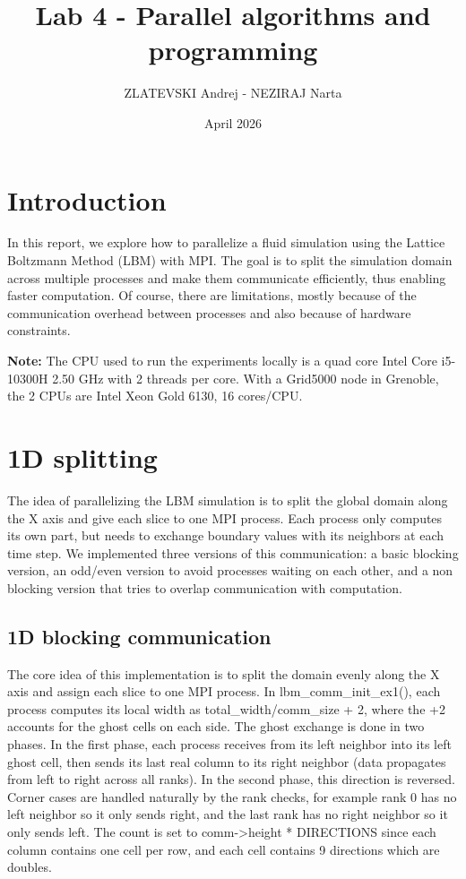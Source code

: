 \documentclass{article}
\title{Lab 4 - Parallel algorithms and programming}
\author{ZLATEVSKI Andrej - NEZIRAJ Narta}
\date{April 2026}
\begin{document}
\maketitle

\section{Introduction}

In this report, we explore how to parallelize a fluid simulation using the Lattice Boltzmann Method (LBM) with MPI. The goal is to split the simulation domain across multiple processes and make them communicate efficiently, thus enabling faster computation. Of course, there are limitations, mostly because of the communication overhead between processes and also because of hardware constraints. 

\vspace{5mm}
\textbf{Note:} The CPU used to run the experiments locally is a quad core Intel Core i5-10300H 2.50 GHz with 2 threads per core. With a Grid5000 node in Grenoble, the 2 CPUs are Intel Xeon Gold 6130, 16 cores/CPU.


\section{1D splitting }

The idea of parallelizing the LBM simulation is to split the global domain along the X axis and give each slice to one MPI process. Each process only computes its own part, but needs to exchange boundary values with its neighbors at each time step. We implemented three versions of this communication: a basic blocking version, an odd/even version to avoid processes waiting on each other, and a non blocking version that tries to overlap communication with computation.


\subsection{1D blocking communication}

The core idea of this implementation is to split the domain evenly along the X axis and assign each slice to one MPI process. In lbm\_comm\_init\_ex1(), each process computes its local width as total\_width/comm\_size + 2, where the +2 accounts for the ghost cells on each side. The ghost exchange is done in two phases. In the first phase, each process receives from its left neighbor into its left ghost cell, then sends its last real column to its right neighbor (data propagates from left to right across all ranks). In the second phase, this direction is reversed. Corner cases are handled naturally by the rank checks, for example rank 0 has no left neighbor so it only sends right, and the last rank has no right neighbor so it only sends left. The count is set to comm->height * DIRECTIONS since each column contains one cell per row, and each cell contains 9 directions which are doubles.
\end{document}
